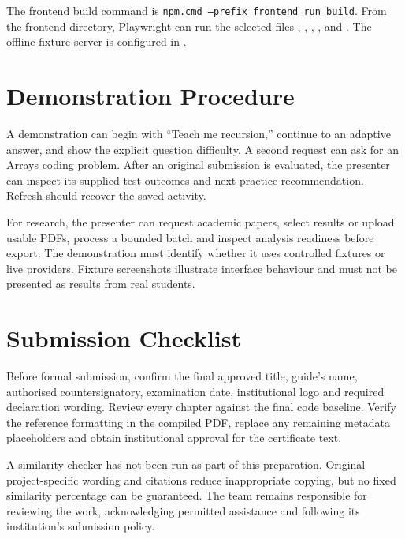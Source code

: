 The frontend build command is \texttt{npm.cmd --prefix frontend run build}. From the frontend directory, Playwright can run the selected files , , , ,   and . The offline fixture server is configured in .

\section{Demonstration Procedure}
A demonstration can begin with ``Teach me recursion,'' continue to an adaptive answer, and show the explicit question difficulty. A second request can ask for an Arrays coding problem. After an original submission is evaluated, the presenter can inspect its supplied-test outcomes and next-practice recommendation. Refresh should recover the saved activity.

For research, the presenter can request academic papers, select results or upload usable PDFs, process a bounded batch and inspect analysis readiness before export. The demonstration must identify whether it uses controlled fixtures or live providers. Fixture screenshots illustrate interface behaviour and must not be presented as results from real students.

\section{Submission Checklist}
Before formal submission, confirm the final approved title, guide's name, authorised countersignatory, examination date, institutional logo and required declaration wording. Review every chapter against the final code baseline. Verify the reference formatting in the compiled PDF, replace any remaining metadata placeholders and obtain institutional approval for the certificate text.

A similarity checker has not been run as part of this preparation. Original project-specific wording and citations reduce inappropriate copying, but no fixed similarity percentage can be guaranteed. The team remains responsible for reviewing the work, acknowledging permitted assistance and following its institution's submission policy.
